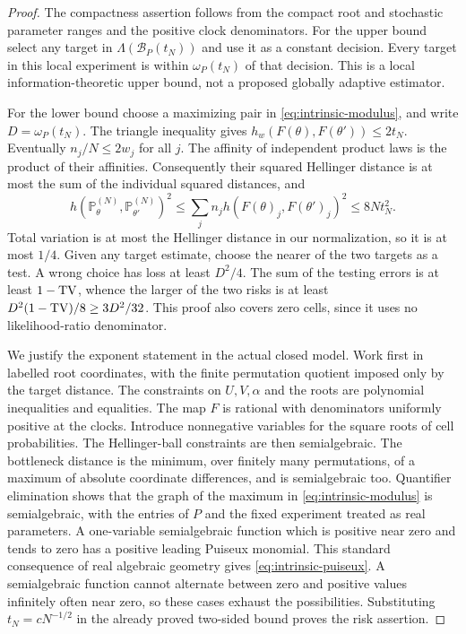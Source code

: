 \begin{proof}
The compactness assertion follows from the compact root and stochastic
parameter ranges and the positive clock denominators. For the upper
bound select any target in $\Lambda(\mathcal B_P(t_N))$ and use it as a
constant decision. Every target in this local experiment is within
$\omega_P(t_N)$ of that decision. This is a local information-theoretic
upper bound, not a proposed globally adaptive estimator.

For the lower bound choose a maximizing pair in
\eqref{eq:intrinsic-modulus}, and write $D=\omega_P(t_N)$. The triangle
inequality gives $h_w(F(\theta),F(\theta'))\le2t_N$. Eventually
$n_j/N\le2w_j$ for all $j$. The affinity of independent product laws is
the product of their affinities. Consequently their squared Hellinger
distance is at most the sum of the individual squared distances, and
\[
 h(\mathbb P_\theta^{(N)},\mathbb P_{\theta'}^{(N)})^2
 \le\sum_jn_jh(F(\theta)_j,F(\theta')_j)^2
 \le 8Nt_N^2.
\]
Total variation is at most the Hellinger distance in our normalization,
so it is at most $1/4$. Given any target estimate, choose the nearer
of the two targets as a test. A wrong choice has loss at least $D^2/4$.
The sum of the testing errors is at least $1-\operatorname{TV}$, whence the larger
of the two risks is at least $D^2(1-\operatorname{TV})/8\ge3D^2/32$. This proof
also covers zero cells, since it uses no likelihood-ratio denominator.

We justify the exponent statement in the actual closed model. Work
first in labelled root coordinates, with the finite permutation
quotient imposed only by the target distance. The constraints on
$U,V,\alpha$ and the roots are polynomial inequalities and equalities.
The map $F$ is rational with denominators uniformly positive at the
clocks. Introduce nonnegative variables for the square roots of cell
probabilities. The Hellinger-ball constraints are then semialgebraic.
The bottleneck distance is the minimum, over finitely many
permutations, of a maximum of absolute coordinate differences, and
is semialgebraic too. Quantifier elimination shows that the graph of
the maximum in \eqref{eq:intrinsic-modulus} is semialgebraic, with the
entries of $P$ and the fixed experiment treated as real parameters.
A one-variable semialgebraic function which is positive near zero and
tends to zero has a positive leading Puiseux monomial. This standard
consequence of real algebraic geometry \cite{BCR98,BPR06} gives
\eqref{eq:intrinsic-puiseux}. A semialgebraic function cannot alternate
between zero and positive values infinitely often near zero, so these
cases exhaust the possibilities. Substituting $t_N=cN^{-1/2}$ in the
already proved two-sided bound proves the risk assertion.
\end{proof}

